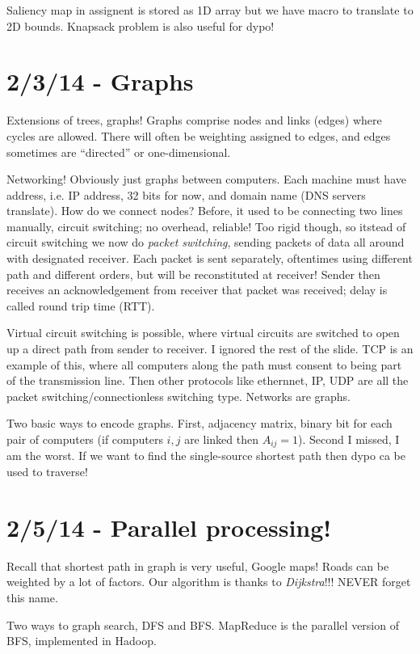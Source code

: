 \documentclass[10pt, twocolumn]{article}
\begin{document}
Saliency map in assignent is stored as 1D array but we have macro to translate to 2D bounds. Knapsack problem is also useful for dypo!

\section{2/3/14 - Graphs}

Extensions of trees, graphs! Graphs comprise nodes and links (edges) where cycles are allowed. There will often be weighting assigned to edges, and edges sometimes are ``directed'' or one-dimensional. 

Networking! Obviously just graphs between computers. Each machine must have address, i.e. IP address, 32 bits for now, and domain name (DNS servers translate). How do we connect nodes? Before, it used to be connecting two lines manually, circuit switching; no overhead, reliable! Too rigid though, so itstead of circuit switching we now do \emph{packet switching}, sending packets of data all around with designated receiver. Each packet is sent separately, oftentimes using different path and different orders, but will be reconstituted at receiver! Sender then receives an acknowledgement from receiver that packet was received; delay is called round trip time (RTT).

Virtual circuit switching is possible, where virtual circuits are switched to open up a direct path from sender to receiver. I ignored the rest of the slide. TCP is an example of this, where all computers along the path must consent to being part of the transmission line. Then other protocols like ethernnet, IP, UDP are all the packet switching/connectionless switching type. Networks are graphs.

Two basic ways to encode graphs. First, adjacency matrix, binary bit for each pair of computers (if computers $i,j$ are linked then $A_{ij} = 1$). Second I missed, I am the worst. If we want to find the single-source shortest path then dypo ca be used to traverse!

\section{2/5/14 - Parallel processing!}

Recall that shortest path in graph is very useful, Google maps! Roads can be weighted by a lot of factors. Our algorithm is thanks to \emph{Dijkstra}!!! NEVER forget this name.

Two ways to graph search, DFS and BFS. MapReduce is the parallel version of BFS, implemented in Hadoop. 
\end{document}

